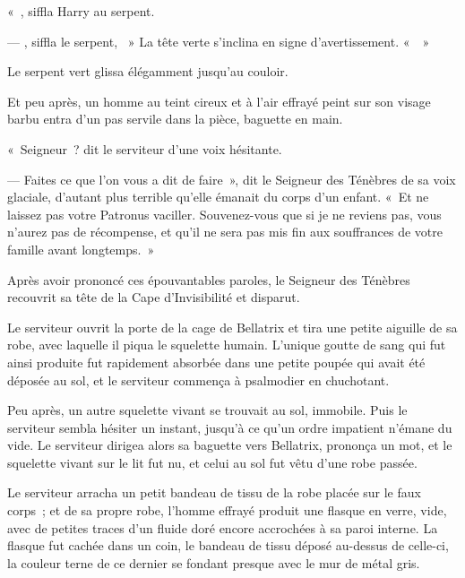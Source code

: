 «~, siffla Harry au serpent. 

--- , siffla le serpent, ~» La tête verte s'inclina en signe d'avertissement. «~~»

Le serpent vert glissa élégamment jusqu'au couloir.

Et peu après, un homme au teint cireux et à l'air effrayé peint sur son visage barbu entra d'un pas servile dans la pièce, baguette en main.

«~Seigneur~? dit le serviteur d'une voix hésitante.

--- Faites ce que l'on vous a dit de faire~», dit le Seigneur des Ténèbres de sa voix glaciale, d'autant plus terrible qu'elle émanait du corps d'un enfant. «~Et ne laissez pas votre Patronus vaciller. Souvenez-vous que si je ne reviens pas, vous n'aurez pas de récompense, et qu'il ne sera pas mis fin aux souffrances de votre famille avant longtemps.~»

Après avoir prononcé ces épouvantables paroles, le Seigneur des Ténèbres recouvrit sa tête de la Cape d'Invisibilité et disparut.

Le serviteur ouvrit la porte de la cage de Bellatrix et tira une petite aiguille de sa robe, avec laquelle il piqua le squelette humain. L'unique goutte de sang qui fut ainsi produite fut rapidement absorbée dans une petite poupée qui avait été déposée au sol, et le serviteur commença à psalmodier en chuchotant.

Peu après, un autre squelette vivant se trouvait au sol, immobile. Puis le serviteur sembla hésiter un instant, jusqu'à ce qu'un ordre impatient n'émane du vide. Le serviteur dirigea alors sa baguette vers Bellatrix, prononça un mot, et le squelette vivant sur le lit fut nu, et celui au sol fut vêtu d'une robe passée.

Le serviteur arracha un petit bandeau de tissu de la robe placée sur le faux corps~; et de sa propre robe, l'homme effrayé produit une flasque en verre, vide, avec de petites traces d'un fluide doré encore accrochées à sa paroi interne. La flasque fut cachée dans un coin, le bandeau de tissu déposé au-dessus de celle-ci, la couleur terne de ce dernier se fondant presque avec le mur de métal gris.

